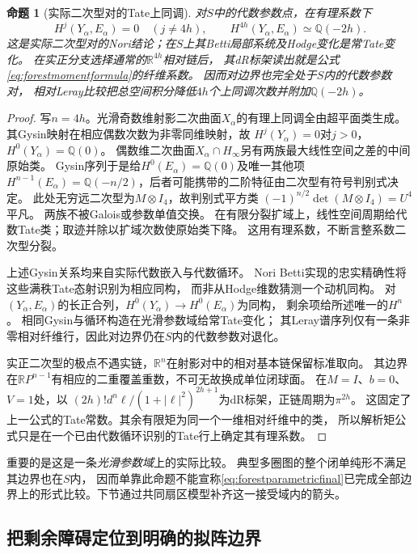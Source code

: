 \documentclass[11pt,a4paper]{ctexart}
\theoremstyle{cnplain}\newtheorem{theorem}{定理}[section]
\newtheorem{proposition}[theorem]{命题}
\theoremstyle{definition}\newtheorem{definition}[theorem]{定义}
\theoremstyle{remark}\newtheorem{remark}[theorem]{注}
\begin{document}
\begin{proposition}[实际二次型对的Tate上同调]
\label{prop:forestquadricpair}
对$S$中的代数参数点，在有理系数下
\[
 H^j(Y_\alpha,E_\alpha)=0\quad(j\ne4h),\qquad
 H^{4h}(Y_\alpha,E_\alpha)\simeq\mathbb Q(-2h).
\]
这是实际二次型对的Nori结论；在$S$上其Betti局部系统及Hodge变化是常Tate变化。
在实正分支选择通常的$\mathbb R^{4h}$相对链后，
其dR标架读出就是公式\eqref{eq:forestmomentformula}的纤维系数。
因而对边界也完全处于$S$内的代数参数对，
相对Leray比较把总空间积分降低$4h$个上同调次数并附加$\mathbb Q(-2h)$。
\end{proposition}

\begin{proof}
写$n=4h$。光滑奇数维射影二次曲面$X_\alpha$的有理上同调全由超平面类生成。
其Gysin映射在相应偶数次数为非零同维映射，故
$H^j(Y_\alpha)=0$对$j>0$，$H^0(Y_\alpha)=\mathbb Q(0)$。
偶数维二次曲面$X_\alpha\cap H_\infty$另有两族最大线性空间之差的中间原始类。
Gysin序列于是给$H^0(E_\alpha)=\mathbb Q(0)$及唯一其他项
$H^{n-1}(E_\alpha)=\mathbb Q(-n/2)$，后者可能携带的二阶特征由二次型有符号判别式决定。
此处无穷远二次型为$M\otimes I_4$，故判别式平方类
$(-1)^{n/2}\det(M\otimes I_4)=U^4$平凡。
两族不被Galois或参数单值交换。
在有限分裂扩域上，线性空间周期给代数Tate类；取迹并除以扩域次数使原始类下降。
这用有理系数，不断言整系数二次型分裂。

上述Gysin关系均来自实际代数嵌入与代数循环。
Nori Betti实现的忠实精确性将这些满秩Tate态射识别为相应同构，
而非从Hodge维数猜测一个动机同构。
对$(Y_\alpha,E_\alpha)$的长正合列，$H^0(Y_\alpha)\to H^0(E_\alpha)$为同构，
剩余项给所述唯一的$H^n$。
相同Gysin与循环构造在光滑参数域给常Tate变化；
其Leray谱序列仅有一条非零相对纤维行，因此对边界仍在$S$内的代数参数对退化。

实正二次型的极点不遇实链，$\mathbb R^n$在射影对中的相对基本链保留标准取向。
其边界在$\mathbb RP^{n-1}$有相应的二重覆盖重数，不可无故换成单位闭球面。
在$M=I$、$b=0$、$V=1$处，以
$(2h)!d^n\ell/(1+|\ell|^2)^{2h+1}$为dR标架，正链周期为$\pi^{2h}$。
这固定了上一公式的Tate常数。其余有限矩为同一个一维相对纤维中的类，
所以解析矩公式只是在一个已由代数循环识别的Tate行上确定其有理系数。
\end{proof}

重要的是这是一条\emph{光滑参数域}上的实际比较。
典型多圈图的整个闭单纯形不满足其边界也在$S$内，
因而单靠此命题不能宣称\eqref{eq:forestparametricfinal}已完成全部边界上的形式比较。下节通过共同扇区模型补齐这一接受域内的箭头。

\subsection{把剩余障碍定位到明确的拟阵边界}
\end{document}
